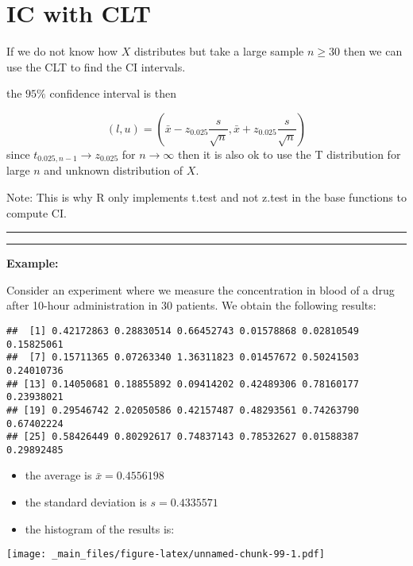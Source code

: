 \documentclass[
]{book}
\begin{document}
\hypertarget{ic-with-clt}{%
\section{IC with CLT}\label{ic-with-clt}}

If we do not know how \(X\) distributes but take a large sample \(n\ge 30\) then we can use the CLT to find the CI intervals.

the \(95\%\) confidence interval is then

\[(l,u)=(\bar{x}-z_{0.025} \frac{s}{\sqrt{n}}, \bar{x}+z_{0.025} \frac{s}{\sqrt{n}})\]
since \(t_{0.025, n-1} \rightarrow z_{0.025}\) for \(n \rightarrow \infty\) then it is also ok to use the T distribution for large \(n\) and unknown distribution of \(X\).

Note: This is why R only implements t.test and not z.test in the base functions to compute CI.

\begin{center}\rule{0.5\linewidth}{0.5pt}\end{center}

\begin{center}\rule{0.5\linewidth}{0.5pt}\end{center}

\textbf{Example:}

Consider an experiment where we measure the concentration in blood of a drug after 10-hour administration in \(30\) patients. We obtain the following results:

\begin{verbatim}
##  [1] 0.42172863 0.28830514 0.66452743 0.01578868 0.02810549 0.15825061
##  [7] 0.15711365 0.07263340 1.36311823 0.01457672 0.50241503 0.24010736
## [13] 0.14050681 0.18855892 0.09414202 0.42489306 0.78160177 0.23938021
## [19] 0.29546742 2.02050586 0.42157487 0.48293561 0.74263790 0.67402224
## [25] 0.58426449 0.80292617 0.74837143 0.78532627 0.01588387 0.29892485
\end{verbatim}

\begin{itemize}
\item
  the average is \(\bar{x}=0.4556198\)
\item
  the standard deviation is \(s=0.4335571\)
\item
  the histogram of the results is:
\end{itemize}

\texttt{[image: \_main\_files/figure-latex/unnamed-chunk-99-1.pdf]}
\end{document}

